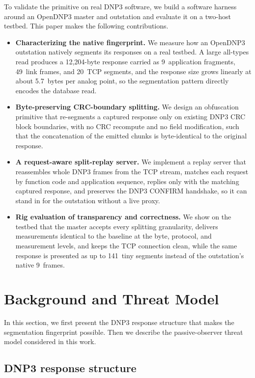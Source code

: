 \documentclass[conference]{IEEEtran}
\begin{document}
To validate the primitive on real DNP3 software, we build a software harness
around an OpenDNP3 master and outstation and evaluate it on a two-host testbed.
This paper makes the following contributions.

\begin{itemize}
\item \textbf{Characterizing the native fingerprint.} We measure how an OpenDNP3
outstation natively segments its responses on a real testbed. A large all-types
read produces a 12{,}204-byte response carried as 9~application fragments,
49~link frames, and 20~TCP segments, and the response size grows linearly at
about 5.7~bytes per analog point, so the segmentation pattern directly encodes
the database read.
\item \textbf{Byte-preserving CRC-boundary splitting.} We design an obfuscation
primitive that re-segments a captured response only on existing DNP3 CRC block
boundaries, with no CRC recompute and no field modification, such that the
concatenation of the emitted chunks is byte-identical to the original response.
\item \textbf{A request-aware split-replay server.} We implement a replay server
that reassembles whole DNP3 frames from the TCP stream, matches each request by
function code and application sequence, replies only with the matching captured
response, and preserves the DNP3 CONFIRM handshake, so it can stand in for the
outstation without a live proxy.
\item \textbf{Rig evaluation of transparency and correctness.} We show on the
testbed that the master accepts every splitting granularity, delivers
measurements identical to the baseline at the byte, protocol, and measurement
levels, and keeps the TCP connection clean, while the same response is presented
as up to 141~tiny segments instead of the outstation's native 9~frames.
\end{itemize}

\section{Background and Threat Model}

In this section, we first present the DNP3 response structure that makes the
segmentation fingerprint possible. Then we describe the passive-observer threat
model considered in this work.

\subsection{DNP3 response structure}
\end{document}
